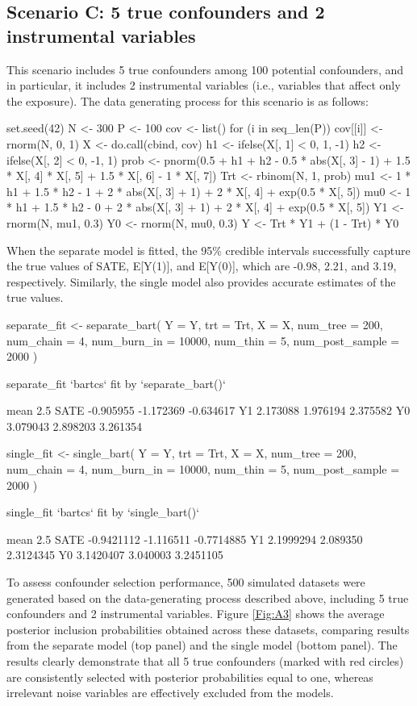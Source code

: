 \subsection*{Scenario C: 5 true confounders and 2 instrumental variables}
This scenario includes 5 true confounders among 100 potential confounders, and in particular, it includes 2 instrumental variables (i.e., variables that affect only the exposure). The data generating process for this scenario is as follows:
\begin{example}
set.seed(42)
N <- 300
P <- 100
cov <- list()
for (i in seq_len(P)) {
  cov[[i]] <- rnorm(N, 0, 1)
}
X <- do.call(cbind, cov)
h1 <- ifelse(X[, 1] < 0, 1, -1)
h2 <- ifelse(X[, 2] < 0, -1, 1)
prob <- pnorm(0.5 + h1 + h2 - 0.5 * abs(X[, 3] - 1) +
                1.5 * X[, 4] * X[, 5] + 1.5 * X[, 6] - 1 * X[, 7])
Trt <- rbinom(N, 1, prob)
mu1 <- 1 * h1 + 1.5 * h2 - 1 + 2 * abs(X[, 3] + 1) +
  2 * X[, 4] + exp(0.5 * X[, 5])
mu0 <- 1 * h1 + 1.5 * h2 - 0 + 2 * abs(X[, 3] + 1) +
  2 * X[, 4] + exp(0.5 * X[, 5])
Y1 <- rnorm(N, mu1, 0.3)
Y0 <- rnorm(N, mu0, 0.3)
Y <- Trt * Y1 + (1 - Trt) * Y0
\end{example}
When the separate model is fitted, the 95\% credible intervals successfully capture the true values of SATE, E[Y(1)], and E[Y(0)], which are -0.98, 2.21, and 3.19, respectively. Similarly, the single model also provides accurate estimates of the true values.
\begin{example}
separate_fit <- separate_bart(
     Y = Y, trt = Trt, X = X, num_tree = 200, num_chain = 4,
     num_burn_in = 10000, num_thin = 5, num_post_sample = 2000
)

separate_fit
`bartcs` fit by `separate_bart()`

          mean      2.5%
SATE -0.905955 -1.172369 -0.634617
Y1    2.173088  1.976194  2.375582
Y0    3.079043  2.898203  3.261354
\end{example}
\begin{example}
single_fit <- single_bart(
     Y = Y, trt = Trt, X = X, num_tree = 200, num_chain = 4,
     num_burn_in = 10000, num_thin = 5, num_post_sample = 2000
)

single_fit
`bartcs` fit by `single_bart()`

           mean      2.5%
SATE -0.9421112 -1.116511 -0.7714885
Y1    2.1999294  2.089350  2.3124345
Y0    3.1420407  3.040003  3.2451105
\end{example}
To assess confounder selection performance, 500 simulated datasets were generated based on the data-generating process described above, including 5 true confounders and 2 instrumental variables. Figure \ref{Fig:A3} shows the average posterior inclusion probabilities obtained across these datasets, comparing results from the separate model (top panel) and the single model (bottom panel). The results clearly demonstrate that all 5 true confounders (marked with red circles) are consistently selected with posterior probabilities equal to one, whereas irrelevant noise variables are effectively excluded from the models.

